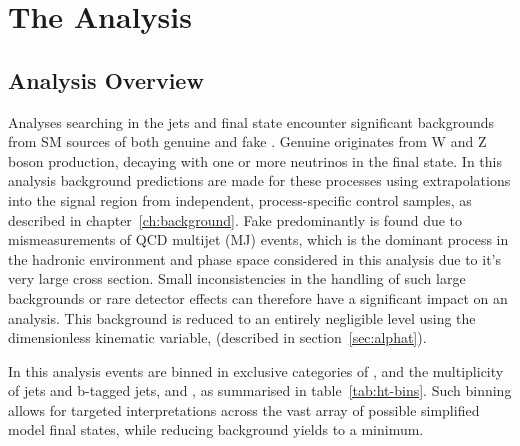 \chapter{The \alphat Analysis}
\label{ch:analysis}

\ifpdf
    \graphicspath{{Chapter5/Figs/Raster/}{Chapter5/Figs/PDF/}{Chapter5/Figs/}}
\else
    \graphicspath{{Chapter5/Figs/Vector/}{Chapter5/Figs/}}
\fi


\section{Analysis Overview}  %
\label{sec:selection_analysis_overview}

Analyses searching in the jets and \met final state encounter significant 
backgrounds from SM sources of both genuine and fake \met. Genuine \met 
originates from W and Z boson production, decaying with one or more neutrinos in
the final state. In this analysis background predictions are made for these
processes using 
extrapolations into the signal region from independent, process-specific control
samples, as described in chapter~\ref{ch:background}.
Fake \met predominantly is found due to mismeasurements of QCD 
multijet (MJ) events, which is the dominant process in the hadronic environment
and 
phase space considered in this analysis due to it's very large cross section. 
Small inconsistencies in the handling of such large backgrounds or rare detector
effects can therefore 
have a significant impact on an analysis. This background is reduced to an 
entirely negligible level using the dimensionless kinematic variable, \alphat
(described in section~\ref{sec:alphat}).


In this analysis events are binned in exclusive categories of \HT, 
and the multiplicity of jets and b-tagged jets,  
\nj and \nb, as summarised in table~\ref{tab:ht-bins}. Such binning allows for
targeted interpretations across the vast array of
possible simplified model final states, while reducing background yields to a 
minimum.

